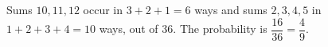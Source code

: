 Sums $10,11,12$ occur in $3+2+1=6$ ways and sums $2,3,4,5$ in $1+2+3+4=10$ ways, out of $36$. The probability is $\dfrac{16}{36}=\boxed{\dfrac49}$.
